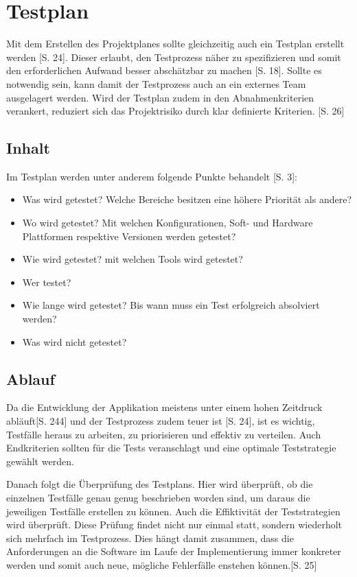 \documentclass[a4paper,bibtotoc,oneside]{scrbook}
\begin{document}
\chapter{Testplan}

Mit dem Erstellen des Projektplanes sollte gleichzeitig auch ein Testplan erstellt werden \cite{eval_automat_webapp_test}[S. 24]. Dieser erlaubt, den Testprozess näher zu spezifizieren und somit den erforderlichen Aufwand besser abschätzbar zu machen \cite{test_large_systems}[S. 18]. Sollte es notwendig sein, kann damit der Testprozess auch an ein externes Team ausgelagert werden. Wird der Testplan zudem in den Abnahmenkriterien verankert, reduziert sich das Projektrisiko durch klar definierte Kriterien. \cite{eval_automat_webapp_test}[S. 26]

\section{Inhalt}
Im Testplan werden unter anderem folgende Punkte behandelt \cite{test_auto}[S. 3]:

\begin{itemize}
	\item Was wird getestet? Welche Bereiche besitzen eine höhere Priorität als andere?
	\item Wo wird getestet? Mit welchen Konfigurationen, Soft- und Hardware Plattformen respektive Versionen werden getestet?
	\item Wie wird getestet? mit welchen Tools wird getestet?
	\item Wer testet?
	\item Wie lange wird getestet? Bis wann muss ein Test erfolgreich absolviert werden?
	\item Was wird nicht getestet?
\end{itemize}


\section{Ablauf}
Da die Entwicklung der Applikation meistens unter einem hohen Zeitdruck abläuft\cite{software_qual}[S. 244] und der Testprozess zudem teuer ist \cite{eval_regression}[S. 24], ist es wichtig, Testfälle heraus zu arbeiten, zu priorisieren und effektiv zu verteilen. Auch Endkriterien sollten für die Tests veranschlagt und eine optimale Teststrategie gewählt werden.

Danach folgt die Überprüfung des Testplans. Hier wird überprüft, ob die einzelnen Testfälle genau genug beschrieben worden sind, um daraus die jeweiligen Testfälle erstellen zu können. Auch die Effiktivität der Teststrategien wird überprüft. Diese Prüfung findet nicht nur einmal statt, sondern wiederholt sich mehrfach im Testprozess. Dies hängt damit zusammen, dass die Anforderungen an die Software im Laufe der Implementierung immer konkreter werden und somit auch neue, mögliche Fehlerfälle enstehen können.\cite{eval_regression}[S. 25] 
\end{document}
